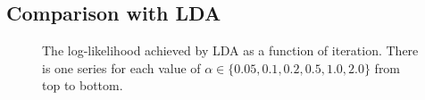 \subsection{Comparison with LDA}
\begin{figure}
\centering
%
%
%

\caption{The log-likelihood achieved by LDA as a function of iteration.  
There is one series for each value of $\alpha \in \{0.05, 0.1, 0.2, 0.5, 1.0, 2.0\}$ from top to bottom.}
\label{fig:ll}
\end{figure}

